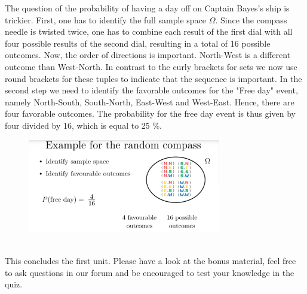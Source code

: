 \documentclass[12pt, a4paper]{scrartcl}
\begin{document}
The question of the probability of having a day off on Captain Bayes’s ship is trickier. First, one has to identify the full sample space $\Omega$. Since the compass needle is twisted twice, one has to combine each result of the first dial with all four possible results of the second dial, resulting in a total of 16 possible outcomes.
Now, the order of directions is important. North-West is a different outcome than West-North. In contrast to the curly brackets for sets we now use round brackets for these tuples to indicate that the sequence is important.
In the second step we need to identify the favorable outcomes for the "Free day" event, namely North-South, South-North, East-West and West-East. Hence, there are four favorable outcomes.
The probability for the free day event is thus given by four divided by 16, which is equal to 25 \%.\\
\begin{figure}[H]
	\centering
	\includegraphics[width=0.75\textwidth]{1_6.png}
\end{figure}
\\

This concludes the first unit. Please have a look at the bonus material, feel free to ask questions in our forum and be encouraged to test your knowledge in the quiz.\\
\end{document}
